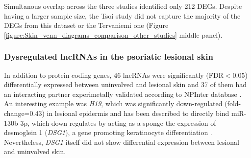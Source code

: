 Simultanous overlap across the three studies identified only 212 DEGs. Despite having a larger sample size, the Tsoi study did not capture the majority of the DEGs from this dataset or the Tervaniemi one (Figure \ref{figure:Skin_venn_diagrams_comparison_other_studies} middle panel). %









\subsubsection{Dysregulated lncRNAs in the psoriatic lesional skin}

In addition to protein coding genes, 46 lncRNAs were significantly (FDR$<$0.05) differentially expressed between uninvolved and lesional skin and 37 of them had an interacting partner experimetally validated according to NPInter database \parencite{Hao2016}. An interesting  example was \textit{H19}, which was significantly down-regulated (fold-change=0.43) in lesional epidermis and has been described to directly bind miR-130b-3p, which down-regulates by acting as a sponge the expression of desmoglein 1 (\textit{DSG1}), a gene promoting keratinocyte differentiation \parencite{Li2017}. Nevertheless, \textit{DSG1} itself did not show differential expression between lesional and uninvolved skin. %


